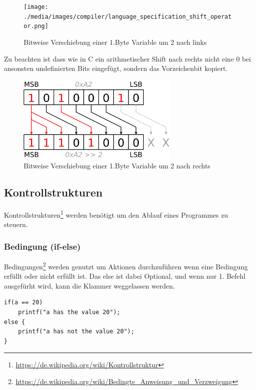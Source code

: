 \begin{figure}[h]
\centering
\texttt{[image: ./media/images/compiler/language\_specification\_shift\_operator.png]}
\caption{Bitweise Verschiebung einer 1.Byte Variable um 2 nach links}
\label{language_specification_shift_operator}
\end{figure}

Zu beachten ist dass wie in C ein arithmetischer Shift nach rechts nicht eine 0 bei ansonsten undefinierten Bits eingef\"ugt, sondern das Vorzeichenbit kopiert.

\begin{figure}[h]
\centering
\includegraphics[width=0.7\textwidth]{./media/images/compiler/language_specification_shift_operator_right.png}
\caption{Bitweise Verschiebung einer 1.Byte Variable um 2 nach rechts}
\label{language_specification_shift_operator_right}
\end{figure}

\newpage
\subsection{Kontrollstrukturen}

Kontrollstrukturen\footnote{\url{https://de.wikipedia.org/wiki/Kontrollstruktur} } werden ben\"otigt um den Ablauf eines Programmes zu steuern.

\subsubsection{Bedingung (if-else)}

Bedingungen\footnote{\url{https://de.wikipedia.org/wiki/Bedingte_Anweisung_und_Verzweigung}} werden genutzt um Aktionen durchzuf\"uhren wenn eine Bedingung erf\"ullt oder nicht erf\"ullt ist. Das else ist dabei Optional, und wenn nur 1. Befehl ausgef\"urht wird, kann die Klammer weggelassen werden.


\begin{lstlisting}[language=CMM]
if(a == 20)
	printf("a has the value 20");
else {
	printf("a has not the value 20");
}
\end{lstlisting}

